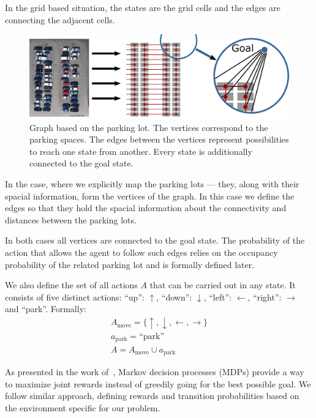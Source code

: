 In the grid based situation, the states are the grid cells and the edges are
connecting the adjacent cells.

\begin{figure}[t]
    \begin{center}
        \includegraphics[width=\textwidth]{pictures/graph.pdf}
    \end{center}
    \caption{Graph based on the parking lot. The vertices correspond to the parking spaces. The edges between the vertices represent possibilities to reach one state from another. Every state is additionally connected to the goal state.}
    \vspace{-5mm}
    \label{fig:graph}
\end{figure}

In the case, where we explicitly map the parking lots --- they, along with
their spacial information, form the vertices of the graph. In this case we
define the edges so that they hold the spacial information about the
connectivity and distances between the parking lots.

In both cases all vertices are connected to the goal state. The probability of
the action that allows the agent to follow such edges relies on the occupancy
probability of the related parking lot and is formally defined later.

We also define the set of all actions $A$ that can be carried out in any
state. It consists of five distinct actions: ``up'': $\uparrow$, ``down'':
$\downarrow$, ``left'': $\leftarrow$, ``right'': $\rightarrow$ and ``park''.
Formally:
\begin{eqnarray}
A_{\mathrm{move}} = \{ \uparrow, \downarrow, \leftarrow, \rightarrow \} \\
a_{\mathrm{park}} = \mbox{``park''} \\
A = A_{\mathrm{move}} \cup a_{\mathrm{park}}
\label{eq:actions}
\end{eqnarray}

As presented in the work of~\citet{tipaldiICRA11}, Markov decision processes
(MDPs) provide a way to maximize joint rewards instead of greedily going for
the best possible goal. We follow similar approach, defining rewards and
transition probabilities based on the environment specific for our problem.

